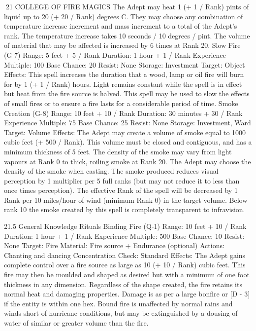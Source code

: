 \documentclass[a4paper]{article}
\begin{document}
\begin{multicols}{3}
21 COLLEGE OF FIRE MAGICS
The Adept may heat 1 (+ 1 / Rank) pints of liquid
up to 20 (+ 20 / Rank) degrees C. They may
choose any combination of temperature increase
increment and mass increment to a total of the
Adept’s rank. The temperature increase takes 10
seconds / 10 degrees / pint. The volume of material
that may be affected is increased by 6 times at
Rank 20.
Slow Fire (G-7)
Range: 5 feet + 5 / Rank
Duration: 1 hour + 1 / Rank
Experience Multiple: 100
Base Chance: 20%
Resist: None
Storage: Investment
Target: Object
Effects: This spell increases the duration that a
wood, lamp or oil fire will burn for by 1 (+ 1 /
Rank) hours. Light remains constant while the spell
is in effect but heat from the fire source is halved.
This spell may be used to slow the effects of small
fires or to ensure a fire lasts for a considerable
period of time.
Smoke Creation (G-8)
Range: 10 feet + 10 / Rank
Duration: 30 minutes + 30 / Rank
Experience Multiple: 75
Base Chance: 25%
Resist: None
Storage: Investment, Ward
Target: Volume
Effects: The Adept may create a volume of smoke
equal to 1000 cubic feet (+ 500 / Rank). This volume must be closed and contiguous, and has a
minimum thickness of 5 feet. The density of the
smoke may vary from light vapours at Rank 0 to
thick, roiling smoke at Rank 20. The Adept may
choose the density of the smoke when casting. The
smoke produced reduces visual perception by 1
multiplier per 5 full ranks (but may not reduce it to
less than once times perception). The effective
Rank of the spell will be decreased by 1 Rank per
10 miles/hour of wind (minimum Rank 0) in the
target volume. Below rank 10 the smoke created by
this spell is completely transparent to infravision.

21.5 General Knowledge Rituals
Binding Fire (Q-1)
Range: 10 feet + 10 / Rank
Duration: 1 hour + 1 / Rank
Experience Multiple: 500
Base Chance: 10%
Resist: None
Target: Fire
Material: Fire source + Endurance (optional)
Actions: Chanting and dancing
Concentration Check: Standard
Effects: The Adept gains complete control over a
fire source as large as 10 (+ 10 / Rank) cubic feet.
This fire may then be moulded and shaped as desired but with a minimum of one foot thickness in
any dimension. Regardless of the shape created,
the fire retains its normal heat and damaging properties. Damage is as per a large bonfire or [D - 3] if
the entity is within one hex. Bound fire is unaffected by normal rains and winds short of hurricane
conditions, but may be extinguished by a dousing
of water of similar or greater volume than the fire.


\end{multicols}
\end{document}

